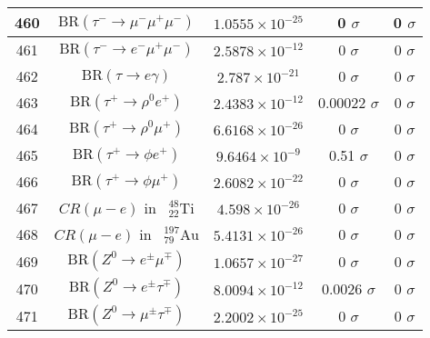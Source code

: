 \begin{longtable}{|c|c|c|c|c|}
460 &	 $\mathrm{BR}(\tau^-\to \mu^-\mu^+\mu^-)$ &	 $1.0555\times 10^{-25}$ &	 0 $ \sigma$ &	 0 $ \sigma$ \\ \hline
461 &	 $\mathrm{BR}(\tau^-\to e^-\mu^+\mu^-)$ &	 $2.5878\times 10^{-12}$ &	 0 $ \sigma$ &	 0 $ \sigma$ \\ \hline
462 &	 $\mathrm{BR}(\tau\to e\gamma)$ &	 $2.787\times 10^{-21}$ &	 0 $ \sigma$ &	 0 $ \sigma$ \\ \hline
463 &	 $\mathrm{BR}(\tau^+\to \rho^0 e^+)$ &	 $2.4383\times 10^{-12}$ &	 \cellcolor{red!0}0.00022 $ \sigma$ &	 0 $ \sigma$ \\ \hline
464 &	 $\mathrm{BR}(\tau^+\to \rho^0\mu^+)$ &	 $6.6168\times 10^{-26}$ &	 0 $ \sigma$ &	 0 $ \sigma$ \\ \hline
465 &	 $\mathrm{BR}(\tau^+\to \phi e^+)$ &	 $9.6464\times 10^{-9}$ &	 \cellcolor{red!25}0.51 $ \sigma$ &	 0 $ \sigma$ \\ \hline
466 &	 $\mathrm{BR}(\tau^+\to \phi\mu^+)$ &	 $2.6082\times 10^{-22}$ &	 0 $ \sigma$ &	 0 $ \sigma$ \\ \hline
467 &	 $CR(\mu - e)$ in $\phantom k^{48}_{22} \mathrm{Ti}$ &	 $4.598\times 10^{-26}$ &	 0 $ \sigma$ &	 0 $ \sigma$ \\ \hline
468 &	 $CR(\mu - e)$ in $\phantom k^{197}_{79} \mathrm{Au}$ &	 $5.4131\times 10^{-26}$ &	 0 $ \sigma$ &	 0 $ \sigma$ \\ \hline
469 &	 $\mathrm{BR}(Z^0\to  e^\pm\mu^\mp)$ &	 $1.0657\times 10^{-27}$ &	 0 $ \sigma$ &	 0 $ \sigma$ \\ \hline
470 &	 $\mathrm{BR}(Z^0\to  e^\pm\tau^\mp)$ &	 $8.0094\times 10^{-12}$ &	 \cellcolor{red!0}0.0026 $ \sigma$ &	 0 $ \sigma$ \\ \hline
471 &	 $\mathrm{BR}(Z^0\to \mu^\pm\tau^\mp)$ &	 $2.2002\times 10^{-25}$ &	 0 $ \sigma$ &	 0 $ \sigma$ \\ \hline
\end{longtable}